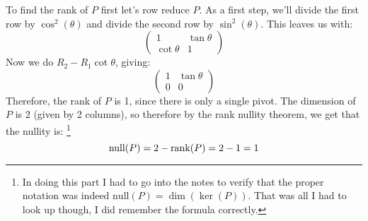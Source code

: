 \documentclass[10pt]{article}
\begin{document}
\begin{enumerate}[label=\alph*)]
			\begin{solution}
				To find the rank of $P$ first let's row reduce $P$. As a first step, we'll divide the first
				row by $\cos^2(\theta)$ and divide the second row by $\sin^2(\theta)$. This leaves us 
				with:
				\[
					\begin{pmatrix} 1 & \tan \theta\\ \cot \theta & 1 \end{pmatrix} 
				\] 
				Now we do $R_2 - R_1 \cot \theta$, giving:
				\[
					\begin{pmatrix} 1 & \tan \theta\\ 0 & 0 \end{pmatrix} 
				\] 
				Therefore, the rank of $P$ is 1, since there is only a single pivot. The dimension of $P$ is 2
				(given by 2 columns), so therefore by the rank nullity theorem, we get that the nullity is:
				\footnote{In doing this part I had to go into the notes to verify that the proper notation was 
				indeed $\mathrm{null}(P) = \dim(\ker(P))$. That was all I had to look up though, I did remember
				the formula correctly.}
				\[
				\mathrm{null}(P) = 2 - \rank(P) = 2 - 1 = 1
				\]


\end{solution}
\end{enumerate}
\end{document}
